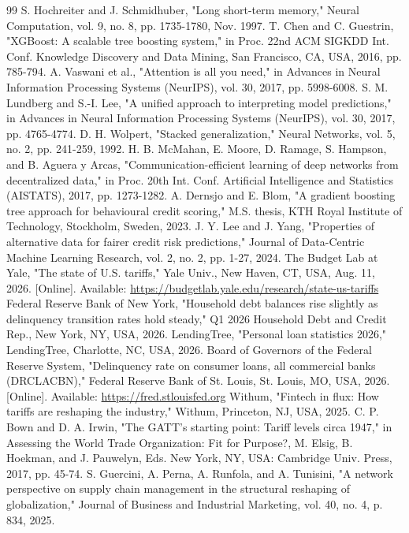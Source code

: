 \documentclass[conference,a4paper]{IEEEtran}
\begin{document}
\begin{thebibliography}{99}
 S. Hochreiter and J. Schmidhuber, "Long short-term memory," Neural Computation, vol. 9, no. 8, pp. 1735-1780, Nov. 1997.
 T. Chen and C. Guestrin, "XGBoost: A scalable tree boosting system," in Proc. 22nd ACM SIGKDD Int. Conf. Knowledge Discovery and Data Mining, San Francisco, CA, USA, 2016, pp. 785-794.
 A. Vaswani et al., "Attention is all you need," in Advances in Neural Information Processing Systems (NeurIPS), vol. 30, 2017, pp. 5998-6008.
 S. M. Lundberg and S.-I. Lee, "A unified approach to interpreting model predictions," in Advances in Neural Information Processing Systems (NeurIPS), vol. 30, 2017, pp. 4765-4774.
 D. H. Wolpert, "Stacked generalization," Neural Networks, vol. 5, no. 2, pp. 241-259, 1992.
 H. B. McMahan, E. Moore, D. Ramage, S. Hampson, and B. Aguera y Arcas, "Communication-efficient learning of deep networks from decentralized data," in Proc. 20th Int. Conf. Artificial Intelligence and Statistics (AISTATS), 2017, pp. 1273-1282.
 A. Dernsjo and E. Blom, "A gradient boosting tree approach for behavioural credit scoring," M.S. thesis, KTH Royal Institute of Technology, Stockholm, Sweden, 2023.
 J. Y. Lee and J. Yang, "Properties of alternative data for fairer credit risk predictions," Journal of Data-Centric Machine Learning Research, vol. 2, no. 2, pp. 1-27, 2024.
 The Budget Lab at Yale, "The state of U.S. tariffs," Yale Univ., New Haven, CT, USA, Aug. 11, 2026. [Online]. Available: \url{https://budgetlab.yale.edu/research/state-us-tariffs}
 Federal Reserve Bank of New York, "Household debt balances rise slightly as delinquency transition rates hold steady," Q1 2026 Household Debt and Credit Rep., New York, NY, USA, 2026.
 LendingTree, "Personal loan statistics 2026," LendingTree, Charlotte, NC, USA, 2026.
 Board of Governors of the Federal Reserve System, "Delinquency rate on consumer loans, all commercial banks (DRCLACBN)," Federal Reserve Bank of St. Louis, St. Louis, MO, USA, 2026. [Online]. Available: \url{https://fred.stlouisfed.org}
 Withum, "Fintech in flux: How tariffs are reshaping the industry," Withum, Princeton, NJ, USA, 2025.
 C. P. Bown and D. A. Irwin, "The GATT's starting point: Tariff levels circa 1947," in Assessing the World Trade Organization: Fit for Purpose?, M. Elsig, B. Hoekman, and J. Pauwelyn, Eds. New York, NY, USA: Cambridge Univ. Press, 2017, pp. 45-74.
 S. Guercini, A. Perna, A. Runfola, and A. Tunisini, "A network perspective on supply chain management in the structural reshaping of globalization," Journal of Business and Industrial Marketing, vol. 40, no. 4, p. 834, 2025.

\end{thebibliography}
\end{document}
